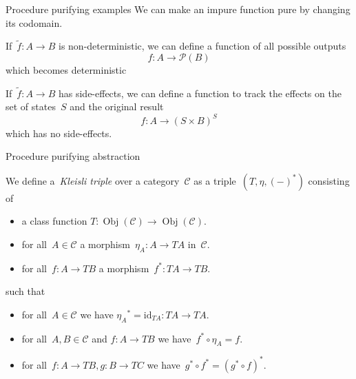 \documentclass[notes]{beamer}
\newcommand{\cat}[1]{\mathcal{#1}}
\newcommand{\id}{\mathrm{id}}
\DeclareMathOperator{\Obj}{Obj}
\begin{document}
\begin{frame}{Procedure purifying examples}
    We can make an impure function pure by changing its codomain.

    \begin{example}
        If~\(\tilde{f}:A\longrightarrow B\) is non-deterministic, we can define
        a function of all possible outputs
        \[
            f:A\longrightarrow\mathcal{P}(B)
        \]
        which becomes deterministic
    \end{example}

    \begin{example}
        If~\(\tilde{f}:A\longrightarrow B\) has side-effects, we can define a
        function to track the effects on the set of states~\(S\) and the
        original result
        \[
            f:A\longrightarrow(S\times B)^{S}
        \]
        which has no side-effects.
    \end{example}
\end{frame}

\begin{frame}{Procedure purifying abstraction}
    \begin{definition}
        We define a~\emph{Kleisli triple} over a category~\(\cat{C}\) as a
        triple~\((T,\eta,(-)^{\ast})\) consisting of
        \begin{itemize}
            \item a class function
                \(T:\Obj(\cat{C})\longrightarrow\Obj(\cat{C})\).

            \item for all~\(A\in\cat{C}\)
                a morphism~\(\eta_{A}:A\longrightarrow TA\)
                in~\(\cat{C}\).

            \item for all~\(f:A\longrightarrow TB\) a
                morphism~\(f^{\ast}:TA\longrightarrow TB\).
        \end{itemize}
        such that
        \begin{itemize}
            \item for all~\(A\in\cat{C}\) we have
                \({\eta_{A}}^{\ast} = \id_{TA}:TA\longrightarrow TA\).

            \item for all~\(A,B\in\cat{C}\) and \(f:A\longrightarrow TB\) we
                have~\(f^{\ast}\circ\eta_{A} = f\).

            \item for all~\(f:A\to TB,g:B\to TC\) we
                have~\(g^{\ast}\circ f^{\ast} = (g^{\ast}\circ f)^{\ast}\).
        \end{itemize}
    \end{definition}
\end{frame}
\end{document}
